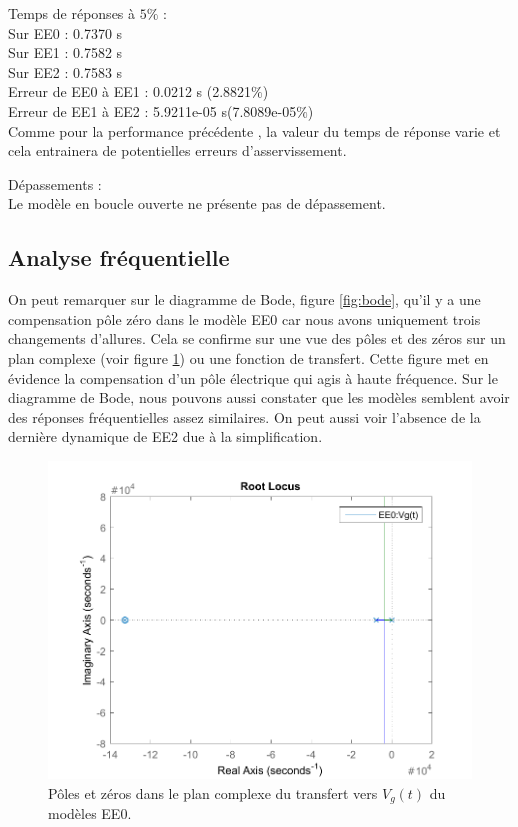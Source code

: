  
\noindent Temps de réponses à $5\%$ :\\
\noindent Sur EE0 : 0.7370 s\\
\noindent Sur EE1 : 0.7582 s\\
\noindent Sur EE2 : 0.7583 s\\
\noindent Erreur de EE0 à EE1 : 0.0212 s (2.8821$\%$)\\
\noindent Erreur de EE1 à EE2 : 5.9211e-05 s(7.8089e-05$\%$)\\
Comme pour la performance précédente , la valeur du temps de réponse varie et cela entrainera de potentielles erreurs d'asservissement.

\noindent Dépassements  :\\
Le modèle en boucle ouverte ne présente pas de dépassement.
\subsection{Analyse fréquentielle}
On peut remarquer sur le diagramme de Bode, figure \ref{fig:bode}, qu'il y a une compensation pôle zéro dans le modèle EE0 car nous avons uniquement trois changements d'allures. Cela se confirme sur une vue des pôles et des zéros sur un plan complexe (voir figure \ref{fig:poles}) ou une fonction de transfert. Cette figure met en évidence la compensation d'un pôle électrique qui agis à haute fréquence. Sur le diagramme de Bode, nous pouvons aussi constater que les modèles semblent avoir des réponses fréquentielles assez similaires. On peut aussi voir l'absence de la dernière dynamique de EE2 due à la simplification.

\begin{figure}[!ht]
\centering
\includegraphics[width=.5\textwidth]{./II/images/poles.pdf}
\caption{\label{fig:poles}Pôles et zéros dans le plan complexe du transfert vers $V_g(t)$ du modèles EE0.}
\end{figure}